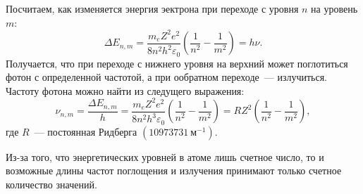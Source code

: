 Посчитаем, как изменяется энергия эектрона при переходе с уровня $n$ на уровень $m$:
\begin{equation}
    \Delta E_{n, m} = \frac{m_e Z^2 e^2}{8 n^2 h^2 \varepsilon_0} \left( \frac{1}{n^2} - \frac{1}{m^2}\right) = h \nu.
\end{equation}
Получается, что при переходе с нижнего уровня на верхний может поглотиться фотон с определенной частотой, а при ообратном переходе~--- излучиться. Частоту фотона можно найти из следущего выражения:
\begin{equation}
    \nu_{n, m} =
    \frac{\Delta E_{n, m}}{h} = \frac{m_e Z^2 e^2}{8 n^2 h^3 \varepsilon_0} \left( \frac{1}{n^2} - \frac{1}{m^2}\right) = R Z^2 \left(\frac{1}{n^2} - \frac{1}{m^2} \right),
\end{equation}
где $R$~--- постоянная Ридберга $(10973731~\text{м}^{-1})$.

Из-за того, что энергетических уровней в атоме лишь счетное число, то и возможные длины частот поглощения и излучения принимают только счетное количество значений.
